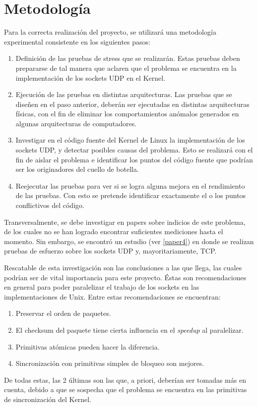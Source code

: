 \documentclass[12pt,spanish,letterpaper]{article}
\begin{document}
\section{Metodología}
\par Para la correcta realización del proyecto, se utilizará una metodología experimental consistente en los siguientes pasos:
\begin{enumerate}
	\item Definición de las pruebas de stress que se realizarán. Estas pruebas deben prepararse de tal manera que aclaren que el problema se encuentra en la implementación de los sockets UDP en el Kernel.
	\item Ejecución de las pruebas en distintas arquitecturas. Las pruebas que se diseñen en el paso anterior, deberán ser ejecutadas en distintas arquitecturas físicas, con el fin de eliminar los comportamientos anómalos generados en algunas arquitecturas de computadores.
	\item Investigar en el código fuente del Kernel de Linux la implementación de los sockets UDP, y detectar posibles causas del problema. Esto se realizará con el fin de aislar el problema e identificar los puntos del código fuente que podrían ser los originadores del cuello de botella.
	\item Reejecutar las pruebas para ver si se logra alguna mejora en el rendimiento de las pruebas. Con esto se pretende identificar exactamente el o los puntos conflictivos del código.
\end{enumerate}
\par Transversalmente, se debe investigar en papers sobre indicios de este problema, de los cuales no se han logrado encontrar suficientes mediciones hasta el momento. Sin embargo, se encontró un estudio (ver \ref{paper4}) en donde se realizan pruebas de esfuerzo sobre los sockets UDP y, mayoritariamente, TCP.
\par Rescatable de esta investigación son las conclusiones a las que llega, las cuales podrían ser de vital importancia para este proyecto. Éstas son recomendaciones en general para poder paralelizar el trabajo de los sockets en las implementaciones de Unix. Entre estas recomendaciones se encuentran:
\begin{enumerate}
	\item Preservar el orden de paquetes.
	\item El checksum del paquete tiene cierta influencia en el \emph{speedup} al paralelizar.
	\item Primitivas atómicas pueden hacer la diferencia.
	\item Sincronización con primitivas simples de bloqueo son mejores.
\end{enumerate}
\par De todas estas, las 2 últimas son las que, a priori, deberían ser tomadas más en cuenta, debido a que se sospecha que el problema se encuentra en las primitivas de sincronización del Kernel.
\newpage
\end{document}
